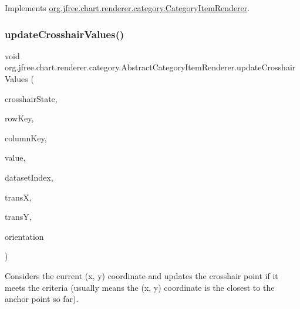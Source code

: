 Implements \mbox{\hyperlink{interfaceorg_1_1jfree_1_1chart_1_1renderer_1_1category_1_1_category_item_renderer_a50195768240d15b1a334a49d66aff2e8}{org.\+jfree.\+chart.\+renderer.\+category.\+Category\+Item\+Renderer}}.

\mbox{\label{classorg_1_1jfree_1_1chart_1_1renderer_1_1category_1_1_abstract_category_item_renderer_aebbd1047a1a17ed75cee062c13a88c9c}} 
\subsubsection{\texorpdfstring{update\+Crosshair\+Values()}{updateCrosshairValues()}}
{\footnotesize\ttfamily void org.\+jfree.\+chart.\+renderer.\+category.\+Abstract\+Category\+Item\+Renderer.\+update\+Crosshair\+Values (\begin{DoxyParamCaption}\item[{\mbox{\hyperlink{classorg_1_1jfree_1_1chart_1_1plot_1_1_category_crosshair_state}{Category\+Crosshair\+State}}}]{crosshair\+State,  }\item[{Comparable}]{row\+Key,  }\item[{Comparable}]{column\+Key,  }\item[{double}]{value,  }\item[{int}]{dataset\+Index,  }\item[{double}]{transX,  }\item[{double}]{transY,  }\item[{\mbox{\hyperlink{classorg_1_1jfree_1_1chart_1_1plot_1_1_plot_orientation}{Plot\+Orientation}}}]{orientation }\end{DoxyParamCaption})\hspace{0.3cm}{\ttfamily [protected]}}

Considers the current (x, y) coordinate and updates the crosshair point if it meets the criteria (usually means the (x, y) coordinate is the closest to the anchor point so far).


